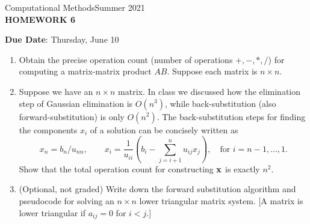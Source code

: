\documentclass[12pt]{article}
\begin{document}
\begin{center}
Computational Methods\qquad Summer 2021
\\

\textbf{\large HOMEWORK 6}\\
\end{center}
\noindent \textbf{Due Date}: Thursday, June 10\\

\begin{enumerate}
\item Obtain the precise operation count (number of operations $+, -,*,/ $) for computing a matrix-matrix product $AB$. Suppose each matrix is $n\times n$.

\item Suppose we have an $n\times n$ matrix. In class we discussed how the elimination step of Gaussian elimination is $O(n^3)$, while back-substitution (also forward-substitution) is only $O(n^2)$. The back-substitution steps for finding the components $x_i$ of a solution can be concisely written as
	\[x_n = b_n/u_{nn},\qquad x_i = \frac{1}{u_{ii}}\left(b_i-\sum_{j=i+1}^n u_{ij}x_j\right),\quad \mathrm{for}\,\,i=n-1,...,1.\]
Show that the total operation count for constructing ${\bf{x}}$ is exactly $n^2$.
\item (Optional, not graded) Write down the forward substitution algorithm and pseudocode for solving an $n\times n$ lower triangular matrix system. [A matrix is lower triangular if $a_{ij}=0$ for $i<j$.]
\end{enumerate}
\end{document}
